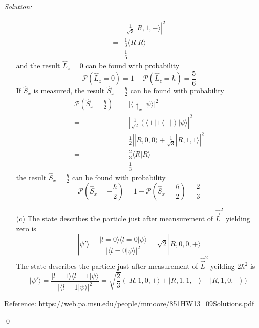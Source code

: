 \documentclass[10pt,a4paper]{article}
\newenvironment{sol}
    {\emph{Solution:}
    }
    {
    \qed
    }
\begin{document}
\begin{sol}
\begin{itemize}
\begin{align}
\nonumber=&\left|\frac{1}{\sqrt{3}}|R,1,-\rangle\right|^2\\
\nonumber=&\frac{1}{3}\langle R|R\rangle\\
=&\frac{1}{6}
\end{align}
and the result $\hat{L}_z=0$ can be found with probability
\begin{equation}
\mathscr{P}(\hat{L}_z=0)=1-\mathscr{P}(\hat{L}_z=\hbar)=\frac{5}{6}
\end{equation}
If $\hat{S}_x$ is measured, the result $\hat{S}_x=\frac{\hbar}{2}$ can be found with probability
\begin{align}
\nonumber\mathscr{P}(\hat{S}_x=\frac{\hbar}{2})=&|\langle\uparrow_x|\psi\rangle|^2\\
\nonumber=&\left|\frac{1}{\sqrt{2}}(\langle+|+\langle-|)|\psi\rangle\right|^2\\
\nonumber=&\frac{1}{2}\left||R,0,0\rangle+\frac{1}{\sqrt{3}}|R,1,1\rangle\right|^2\\
\nonumber=&\frac{2}{3}\langle R|R\rangle\\
=&\frac{1}{3}
\end{align}
the result $\hat{S}_x=\frac{\hbar}{2}$ can be found with probability
\begin{equation}
\mathscr{P}(\hat{S}_x=-\frac{\hbar}{2})=1-\mathscr{P}(\hat{S}_x=\frac{\hbar}{2})=\frac{2}{3}
\end{equation}
\item[(c)] The state describes the particle just after meansurement of $\hat{\vec{L}}^2$ yielding zero is
\begin{equation}
|\psi'\rangle=\frac{|l=0\rangle\langle l=0|\psi\rangle}{|\langle l=0|\psi\rangle|^2}=\sqrt{2}|R,0,0,+\rangle
\end{equation}
The state describes the particle just after measurement of $\hat{\vec{L}}^2$ yeilding $2\hbar^2$ is
\begin{equation}
|\psi'\rangle=\frac{|l=1\rangle\langle l=1|\psi\rangle}{|\langle l=1|\psi\rangle|^2}=\sqrt{\frac{2}{3}}(|R,1,0,+\rangle+|R,1,1,-\rangle-|R,1,0,-\rangle)
\end{equation}
\end{itemize}
\small{Reference: https://web.pa.msu.edu/people/mmoore/851HW13\_09Solutions.pdf}
\end{sol}
\end{document}
